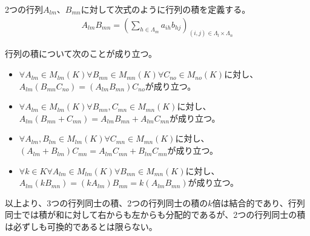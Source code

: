 \documentclass[dvipdfmx]{jsarticle}
\begin{document}
\begin{dfn}
2つの行列$A_{lm}$、$B_{mn}$に対して次式のように行列の積を定義する。
\begin{align*}
A_{lm}B_{mn} = \left( \sum_{h \in \varLambda_{m}} {a_{ih}b_{hj}} \right)_{(i,j) \in \varLambda_{l} \times \varLambda_{n}}
\end{align*}
\end{dfn}
\begin{thm}\label{4.1.2.8} 行列の積について次のことが成り立つ。
\begin{itemize}
\item
  $\forall A_{lm} \in M_{lm}(K)\forall B_{mn} \in M_{mn}(K)\forall C_{no} \in M_{no}(K)$に対し、$A_{lm}\left( B_{mn}C_{no} \right) = \left( A_{lm}B_{mn} \right)C_{no}$が成り立つ。
\item
  $\forall A_{lm} \in M_{lm}(K)\forall B_{mn},C_{mn} \in M_{mn}(K)$に対し、$A_{lm}\left( B_{mn} + C_{mn} \right) = A_{lm}B_{mn} + A_{lm}C_{mn}$が成り立つ。
\item
  $\forall A_{lm},B_{lm} \in M_{lm}(K)\forall C_{mn} \in M_{mn}(K)$に対し、$\left( A_{lm} + B_{lm} \right)C_{mn} = A_{lm}C_{mn} + B_{lm}C_{mn}$が成り立つ。
\item
  $\forall k \in K\forall A_{lm} \in M_{lm}(K)\forall B_{mn} \in M_{mn}(K)$に対し、$A_{lm}\left( kB_{mn} \right) = \left( kA_{lm} \right)B_{mn} = k\left( A_{lm}B_{mn} \right)$が成り立つ。
\end{itemize}
\end{thm}\par
以上より、3つの行列同士の積、2つの行列同士の積の$k$倍は結合的であり、行列同士では積が和に対して右からも左からも分配的であるが、2つの行列同士の積は必ずしも可換的であるとは限らない。
\end{document}
